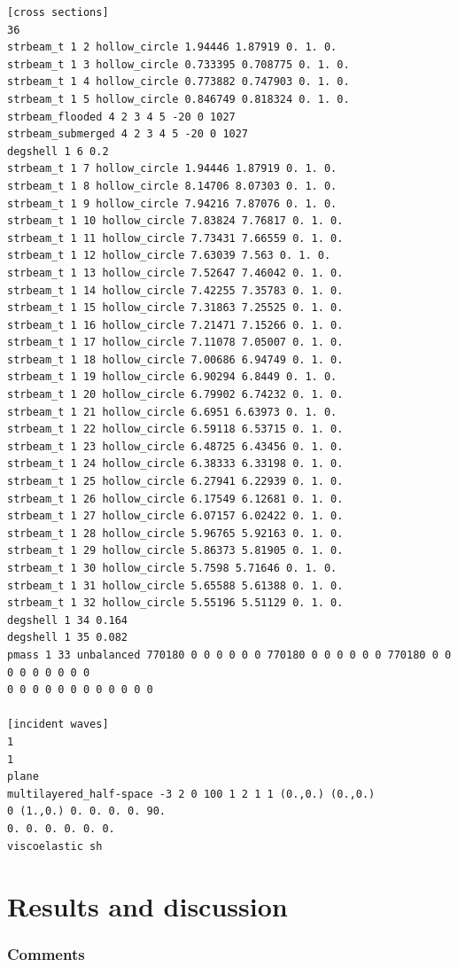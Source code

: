\documentclass[a4]{article}
\begin{document}
\begin{Verbatim}
[cross sections]
36
strbeam_t 1 2 hollow_circle 1.94446 1.87919 0. 1. 0.
strbeam_t 1 3 hollow_circle 0.733395 0.708775 0. 1. 0.
strbeam_t 1 4 hollow_circle 0.773882 0.747903 0. 1. 0.
strbeam_t 1 5 hollow_circle 0.846749 0.818324 0. 1. 0.
strbeam_flooded 4 2 3 4 5 -20 0 1027
strbeam_submerged 4 2 3 4 5 -20 0 1027
degshell 1 6 0.2
strbeam_t 1 7 hollow_circle 1.94446 1.87919 0. 1. 0.
strbeam_t 1 8 hollow_circle 8.14706 8.07303 0. 1. 0.
strbeam_t 1 9 hollow_circle 7.94216 7.87076 0. 1. 0.
strbeam_t 1 10 hollow_circle 7.83824 7.76817 0. 1. 0.
strbeam_t 1 11 hollow_circle 7.73431 7.66559 0. 1. 0.
strbeam_t 1 12 hollow_circle 7.63039 7.563 0. 1. 0.
strbeam_t 1 13 hollow_circle 7.52647 7.46042 0. 1. 0.
strbeam_t 1 14 hollow_circle 7.42255 7.35783 0. 1. 0.
strbeam_t 1 15 hollow_circle 7.31863 7.25525 0. 1. 0.
strbeam_t 1 16 hollow_circle 7.21471 7.15266 0. 1. 0.
strbeam_t 1 17 hollow_circle 7.11078 7.05007 0. 1. 0.
strbeam_t 1 18 hollow_circle 7.00686 6.94749 0. 1. 0.
strbeam_t 1 19 hollow_circle 6.90294 6.8449 0. 1. 0.
strbeam_t 1 20 hollow_circle 6.79902 6.74232 0. 1. 0.
strbeam_t 1 21 hollow_circle 6.6951 6.63973 0. 1. 0.
strbeam_t 1 22 hollow_circle 6.59118 6.53715 0. 1. 0.
strbeam_t 1 23 hollow_circle 6.48725 6.43456 0. 1. 0.
strbeam_t 1 24 hollow_circle 6.38333 6.33198 0. 1. 0.
strbeam_t 1 25 hollow_circle 6.27941 6.22939 0. 1. 0.
strbeam_t 1 26 hollow_circle 6.17549 6.12681 0. 1. 0.
strbeam_t 1 27 hollow_circle 6.07157 6.02422 0. 1. 0.
strbeam_t 1 28 hollow_circle 5.96765 5.92163 0. 1. 0.
strbeam_t 1 29 hollow_circle 5.86373 5.81905 0. 1. 0.
strbeam_t 1 30 hollow_circle 5.7598 5.71646 0. 1. 0.
strbeam_t 1 31 hollow_circle 5.65588 5.61388 0. 1. 0.
strbeam_t 1 32 hollow_circle 5.55196 5.51129 0. 1. 0.
degshell 1 34 0.164
degshell 1 35 0.082
pmass 1 33 unbalanced 770180 0 0 0 0 0 0 770180 0 0 0 0 0 0 770180 0 0 0 0 0 0 0 0 0 
0 0 0 0 0 0 0 0 0 0 0 0 

[incident waves]
1
1
plane
multilayered_half-space -3 2 0 100 1 2 1 1 (0.,0.) (0.,0.)
0 (1.,0.) 0. 0. 0. 0. 90.
0. 0. 0. 0. 0. 0.
viscoelastic sh
\end{Verbatim}

\part{Results and discussion}

\section{Comments}
\end{document}
